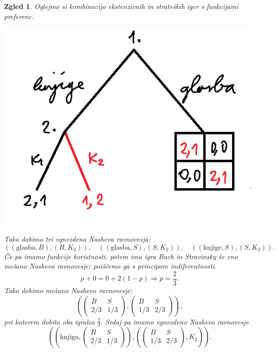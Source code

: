 \documentclass[10pt, a4paper]{article}
\newtheorem{zgled}[izr]{Zgled}
\begin{document}
\begin{zgled}
  Oglejmo si kombinacijo ekstenzivnih in strateških iger s funkcijami preferenc.
  \begin{center}
    \includegraphics[scale=0.8]{drevo_7.png}
  \end{center}
  Tako dobimo tri vgnezdena Nasheva ravnovesja: 
  $$((\mathrm{glasba}, B), (B, K_2)),\quad ((\mathrm{glasba}, S), (S, K_2)), \quad ((\mathrm{knjige}, S), (S, K_2)).$$
  Če pa imamo funkcije koristnosti, potem ima igra Bach in Stravinsky še eno mešano Nashevo ravnovesje;
  poiščemo ga s principom indiferentnosti.
  $$p + 0 = 0 + 2(1 - p) \Rightarrow p = \frac{2}{3}.$$
  Tako dobimo mešano Nashevo ravnovesje:
  $$\left(\begin{pmatrix}
    B & S\\ 2/3 & 1/3
  \end{pmatrix}, \begin{pmatrix}
    B & S\\ 1/3 & 2/3
  \end{pmatrix}\right),$$
  pri katerem dobita oba igralca $\frac{2}{3}$.
  Sedaj pa imamo vgnezdeno Nashevo ravnovesje 
  $$\left(\left(\mathrm{knjiga}, \begin{pmatrix}
    B & S\\ 2/3 & 1/3
  \end{pmatrix}\right), \left(\begin{pmatrix}
    B & S\\ 1/3 & 2/3
  \end{pmatrix}, K_2\right)\right).$$
\end{zgled}
\end{document}
